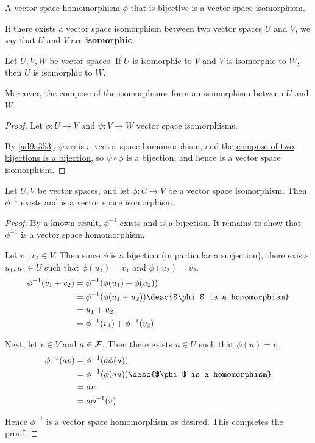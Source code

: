 \label{fc59d72}

A \href{eacdfee}{vector space homomorphism} $\phi$ that is
\href{d205f32}{bijective} is a vector space isomorphism.

If there exists a vector space isomorphism between two vector spaces $U$ and
$V$, we say that $U$ and $V$ are \textbf{isomorphic}.

\label{b80882d}

Let $U,V,W$ be vector spaces. If $U$ is isomorphic to $V$ and $V$ is isomorphic
to $W$, then $U$ is isomorphic to $W$.

Moreover, the compose of the isomorphisms form an isomorphism between $U$ and
$W$.

\begin{proof}
  Let $\phi:U\to V$ and $\psi:V\to W$ vector space isomorphisms.

  By \autoref{ad9a353}, $\psi\circ\phi$ is a vector space homomorphism, and the
  \href{c0883e7}{compose of two bijections is a bijection}, so $\psi\circ\phi$
  is a bijection, and hence is a vector space isomorphism.
\end{proof}

\label{d2f7132}

Let $U,V$ be vector spaces, and let $\phi:U\to V$ be a vector space
isomorphism. Then $\phi^{-1}$ exists and is a vector space isomorphism.

\begin{proof}
  By a \href{fb1a7df}{known result}, $\phi^{-1}$ exists and is a bijection. It
  remains to show that $\phi^{-1}$ is a vector space homomorphism.

  Let $v_1,v_2\in V$. Then since $\phi$ is a bijection (in particular a
  surjection), there exists $u_1,u_2\in U$ such that $\phi(u_1)=v_1$ and
  $\phi(u_2)=v_2$.
  \begin{align*}
    \phi^{-1}(v_1+v_2) &=\phi^{-1}(\phi(u_1)+\phi(u_2))                          \\
                       &=\phi^{-1}(\phi(u_1+u_2))\desc{$\phi$ is a homomorphism} \\
                       &=u_1+u_2                                                 \\
                       &=\phi^{-1}(v_1)+\phi^{-1}(v_2)
  \end{align*}

  Next, let $v\in V$ and $a\in\mathcal F$. Then there exists $u\in U$ such that
  $\phi(u)=v$.
  \begin{align*}
    \phi^{-1}(av) &=\phi^{-1}(a\phi(u))                                \\
                  &=\phi^{-1}(\phi(au))\desc{$\phi$ is a homomorphism} \\
                  &=au                                                 \\
                  &=a\phi^{-1}(v)
  \end{align*}

  Hence $\phi^{-1}$ is a vector space homomorphism as desired. This completes
  the proof.
\end{proof}

